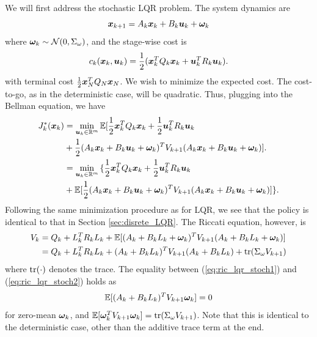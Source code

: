 We will first address the stochastic LQR problem. The system dynamics are
\begin{equation}
    \bm{x}_{k+1} = A_k \bm{x}_k + B_k \bm{u}_k + \bm{\omega}_{k}
\end{equation}
where $\bm{\omega}_{k} \sim \mathcal{N}(0, \Sigma_{\omega})$, and the stage-wise cost is 
\begin{equation}
    c_k(\bm{x}_k,\bm{u}_k) = \frac{1}{2} ( \bm{x}_k^T Q_k \bm{x}_k + \bm{u}_k^T R_k \bm{u}_k).
\end{equation}
with terminal cost $\frac{1}{2}\bm{x}_N^T Q_N \bm{x}_N$. We wish to minimize the expected cost. The cost-to-go, as in the deterministic case, will be quadratic. Thus, plugging into the Bellman equation, we have 
\begin{align}
\label{eq:LQR_rec_cost_stoch}
    J_{k}^*(\bm{x}_{k}) &=  \min_{\bm{u}_{k} \in \mathbb{R}^m} \mathbb{E} {\Large[} 
    \frac{1}{2} \bm{x}_{k}^T Q_{k} \bm{x}_{k} + \frac{1}{2} \bm{u}_{k}^T R_{k} \bm{u}_{k}\\
    &+ \frac{1}{2} (A_{k} \bm{x}_{k} + B_{k} \bm{u}_{k} + \bm{\omega}_{k})^T V_{k+1} (A_{k} \bm{x}_{k} + B_{k} \bm{u}_{k} + \bm{\omega}_{k}) \nonumber {\Large]}. \nonumber\\
    &= \min_{\bm{u}_{k} \in \mathbb{R}^m} {\Large\{} 
    \frac{1}{2} \bm{x}_{k}^T Q_{k} \bm{x}_{k} + \frac{1}{2} \bm{u}_{k}^T R_{k} \bm{u}_{k} \\
    &+ \mathbb{E} {\Large[} \frac{1}{2} (A_{k} \bm{x}_{k} + B_{k} \bm{u}_{k} + \bm{\omega}_{k})^T V_{k+1} (A_{k} \bm{x}_{k} + B_{k} \bm{u}_{k} + \bm{\omega}_{k}) \nonumber {\Large]} {\Large\}}. \nonumber
\end{align}
Following the same minimization procedure as for LQR, we see that the policy is identical to that in Section \ref{sec:disrete_LQR}. The Riccati equation, however, is
\begin{align}
    V_k &= Q_k + L_k^T R_k L_k + \mathbb{E}[(A_{k}+ B_{k} L_k + \bm{\omega}_{k})^T V_{k+1} (A_{k} + B_{k} L_k + \bm{\omega}_{k})] \label{eq:ric_lqr_stoch1}\\
    &= Q_{k}  + L_{k}^T R_{k} L_{k} + (A_{k} + B_{k} L_{k})^T V_{k+1}   (A_{k} + B_{k} L_{k}) + \text{tr}(\Sigma_{\omega} V_{k+1}) \label{eq:ric_lqr_stoch2}
\end{align}
where $\text{tr}(\cdot)$ denotes the trace. The equality between (\ref{eq:ric_lqr_stoch1}) and (\ref{eq:ric_lqr_stoch2}) holds as 
\begin{equation}
    \mathbb{E}[(A_{k} + B_{k} L_{k})^T V_{k+1} \bm{\omega}_{k}] = 0
\end{equation} 
for zero-mean $\bm{\omega}_{k}$, and $\mathbb{E}[\bm{\omega}_{k}^T V_{k+1} \bm{\omega}_{k}] = \text{tr}(\Sigma_{\omega} V_{k+1})$. Note that this is identical to the deterministic case, other than the additive trace term at the end. 


